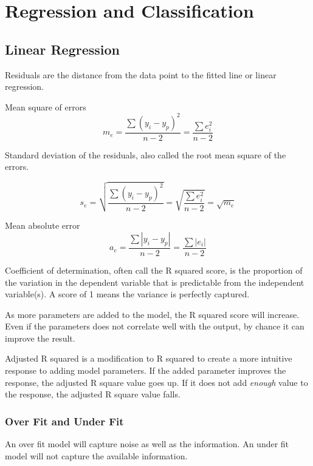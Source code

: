 	\chapter{Regression and Classification}
	\section{Linear Regression}
Residuals are the distance from the data point to the fitted line or linear regression.

Mean square of errors
	\begin{equation}
		m_e = \frac{\sum \left(y_i - y_p\right)^2}{n-2} = \frac{\sum e_i^2}{n-2}
	\end{equation}

Standard deviation of the residuals, also called the root mean square of the errors.

	\begin{equation}
		s_e = \sqrt{\frac{\sum \left(y_i - y_p\right)^2}{n-2}} = \sqrt{\frac{\sum e_i^2}{n-2}} = \sqrt{m_e}
	\end{equation}

Mean absolute error
	\begin{equation}
		a_e = \frac{\sum \left|y_i - y_p\right|}{n-2} = \frac{\sum \left|e_i\right|}{n-2}
	\end{equation}

	\begin{mathwhere}
	\end{mathwhere}

Coefficient of determination, often call the R squared score, is the proportion of the variation in the dependent variable that is predictable from the independent variable(s).  A score of 1 means the variance is perfectly captured.

As more parameters are added to the model, the R squared score will increase.  Even if the parameters does not correlate well with the output, by chance it can improve the result.

Adjusted R squared is a modification to R squared to create a more intuitive response to adding model parameters.  If the added parameter improves the response, the adjusted R square value goes up.  If it does not add \emph{enough} value to the response, the adjusted R square value falls.

	\subsection{Over Fit and Under Fit}
An over fit model will capture noise as well as the information.  An under fit model will not capture the available information.

